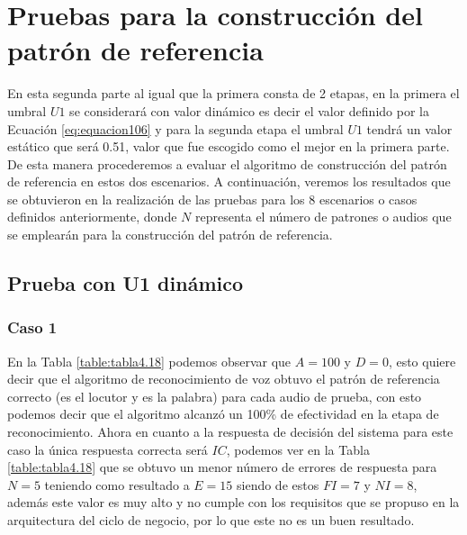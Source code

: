 \section{Pruebas para la construcción del patrón de referencia}
En esta segunda parte al igual que la primera consta de 2 etapas, en la primera el umbral $U1$ se considerará con valor dinámico es decir el valor definido por la Ecuación \eqref{eq:equacion106} y para la segunda etapa el umbral $U1$ tendrá un valor estático que será 0.51, valor que fue escogido como el mejor en la primera parte. De esta manera procederemos a evaluar el algoritmo de construcción del patrón de referencia en estos dos escenarios.
\vskip 0.5cm
A continuación, veremos los resultados que se obtuvieron en la realización de las pruebas para los 8 escenarios o casos definidos anteriormente, donde $N$ representa el número de patrones o audios que se emplearán para la construcción del patrón de referencia.

\subsection{Prueba con U1 dinámico}
\subsubsection{Caso 1}
En la Tabla \ref{table:tabla4.18} podemos observar que $A = 100$ y $D = 0$, esto quiere decir que el algoritmo de reconocimiento de voz obtuvo el patrón de referencia correcto (es el locutor y es la palabra) para cada audio de prueba, con esto podemos decir que el algoritmo alcanzó un 100\% de efectividad en la etapa de reconocimiento.
\vskip 0.5cm
Ahora en cuanto a la respuesta de decisión del sistema para este caso la única respuesta correcta será $IC$, podemos ver en la Tabla \ref{table:tabla4.18} que se obtuvo un menor número de errores de respuesta para $N = 5$ teniendo como resultado a $E = 15$ siendo de estos $FI = 7$ y $NI = 8$, además este valor es muy alto y no cumple con los requisitos que se propuso en la arquitectura del ciclo de negocio, por lo que este no es un buen resultado.

